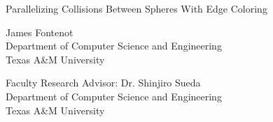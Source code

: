 \begin{singlespace}

\begin{center}


Parallelizing Collisions Between Spheres With Edge Coloring \\
\vspace{3em}


James Fontenot \\
Department of Computer Science and Engineering \\
Texas A\&M University

\vspace{3em}


Faculty Research Advisor: Dr. Shinjiro Sueda \\
Department of Computer Science and Engineering \\
Texas A\&M University

\vspace{3em}
\end{center}
\end{singlespace}


\pagestyle{plain}
\setcounter{page}{1}

